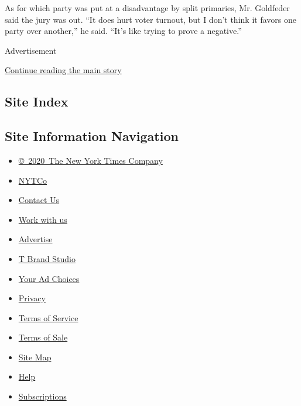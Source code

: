 As for which party was put at a disadvantage by split primaries, Mr.
Goldfeder said the jury was out. ``It does hurt voter turnout, but I
don't think it favors one party over another,'' he said. ``It's like
trying to prove a negative.''

Advertisement

\protect\hyperlink{after-bottom}{Continue reading the main story}

\hypertarget{site-index}{%
\subsection{Site Index}\label{site-index}}

\hypertarget{site-information-navigation}{%
\subsection{Site Information
Navigation}\label{site-information-navigation}}

\begin{itemize}
\tightlist
\item
  \href{https://help.nytimes3xbfgragh.onion/hc/en-us/articles/115014792127-Copyright-notice}{©~2020~The
  New York Times Company}
\end{itemize}

\begin{itemize}
\tightlist
\item
  \href{https://www.nytco.com/}{NYTCo}
\item
  \href{https://help.nytimes3xbfgragh.onion/hc/en-us/articles/115015385887-Contact-Us}{Contact
  Us}
\item
  \href{https://www.nytco.com/careers/}{Work with us}
\item
  \href{https://nytmediakit.com/}{Advertise}
\item
  \href{http://www.tbrandstudio.com/}{T Brand Studio}
\item
  \href{https://www.nytimes3xbfgragh.onion/privacy/cookie-policy\#how-do-i-manage-trackers}{Your
  Ad Choices}
\item
  \href{https://www.nytimes3xbfgragh.onion/privacy}{Privacy}
\item
  \href{https://help.nytimes3xbfgragh.onion/hc/en-us/articles/115014893428-Terms-of-service}{Terms
  of Service}
\item
  \href{https://help.nytimes3xbfgragh.onion/hc/en-us/articles/115014893968-Terms-of-sale}{Terms
  of Sale}
\item
  \href{https://spiderbites.nytimes3xbfgragh.onion}{Site Map}
\item
  \href{https://help.nytimes3xbfgragh.onion/hc/en-us}{Help}
\item
  \href{https://www.nytimes3xbfgragh.onion/subscription?campaignId=37WXW}{Subscriptions}
\end{itemize}

